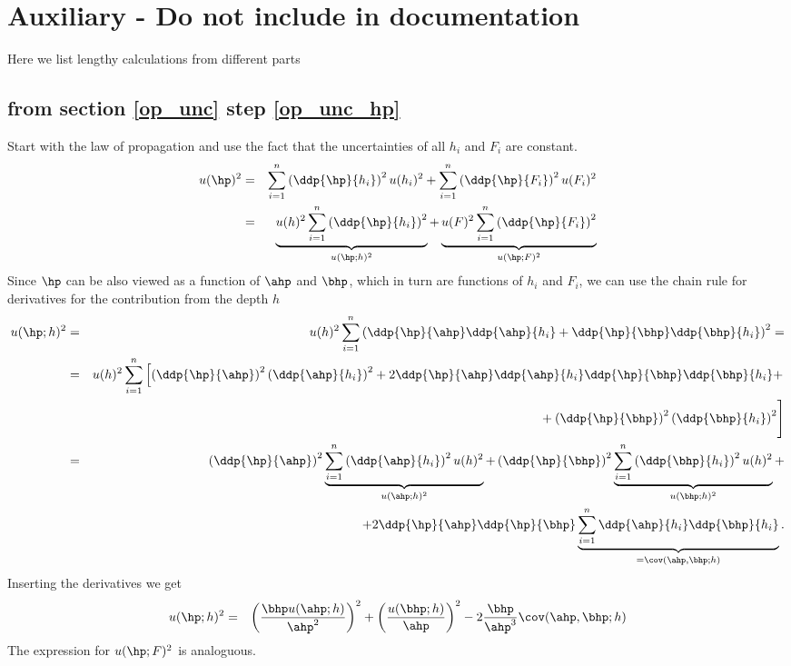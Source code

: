 %
%
\section{Auxiliary - Do not include in documentation}
Here we list lengthy calculations from different parts
\subsection{ from section \ref{op_unc} step \ref{op_unc_hp}}
Start with the law of propagation and use the fact that the uncertainties of all $h_i$ and $F_i$ are constant.
 \begin{eqnarray*}
  u(\hp)^2 &=& \sum_{i=1}^n  \left( \ddp{ \hp}{h_i} \right)^2 u(h_i)^2 + \sum_{i=1}^n   \left( \ddp{ \hp}{F_i} \right)^2 u(F_i)^2 \\
   &=& \underbrace{u(h)^2 \sum_{i=1}^n  \left( \ddp{ \hp}{h_i} \right)^2}_{u(\hp; h)^2} + \underbrace{u(F)^2 \sum_{i=1}^n  \left( \ddp{ \hp}{F_i} \right)^2}_{u(\hp; F)^2} 
 \end{eqnarray*}
 Since $\hp$ can be also viewed as a function of $\ahp$ and  $\bhp$, which in turn are functions of $h_i$ and $F_i$, we can use the chain rule for derivatives for the contribution from the depth $h$
 \begin{eqnarray*}
  u(\hp; h)^2 &= &  
  u(h)^2 \sum_{i=1}^n  \left( 
  \ddp{ \hp}{\ahp} \ddp{ \ahp}{h_i} + 
  \ddp{ \hp}{\bhp} \ddp{\bhp}{h_i}
  \right)^2 = \\
  &= & u(h)^2 \sum_{i=1}^n \left[  
  \left( \ddp{\hp}{\ahp}  \right) ^2 
  \left(\ddp{ \ahp}{h_i} \right)^2 + 
  2 \ddp{ \hp}{ \ahp} \ddp{ \ahp}{ h_i} \ddp{ \hp}{ \bhp}\ddp{ \bhp}{ h_i} + \right.\\
  &&  \left. \phantom{u(h)^2 \sum_{i=1}^n} +
  \left(\ddp{ \hp}{ \bhp}\right)^2
  \left(\ddp{ \bhp}{ h_i}\right)^2  \right] \\
  &=& 
  \left( \ddp{ \hp}{ \ahp}  \right) ^2 
  \underbrace{\sum_{i=1}^n \left(\ddp{ \ahp}{ h_i} \right)^2
  u(h)^2 }_{u(\ahp;h)^2} +
  \left( \ddp{ \hp}{ \bhp}  \right) ^2 
  \underbrace{\sum_{i=1}^n \left(\ddp{ \bhp}{ h_i} \right)^2
   u(h)^2 }_{u(\bhp;h)^2} + \\
   & & + 2 \ddp{ \hp}{ \ahp} \ddp{ \hp}{ \bhp} 
   \underbrace{\sum_{i=1}^n \ddp{ \ahp}{ h_i} \ddp{ \bhp}{ h_i}}_{=\cov(\ahp, \bhp;h)}.
 \end{eqnarray*}
Inserting the derivatives we get
 \begin{eqnarray*}
 u(\hp; h)^2  &=&  \left( \frac{\bhp u(\ahp; h)}{\ahp^2} \right)^2 +\left(\frac{u(\bhp; h)}{\ahp} \right)^2 - 2  \frac{\bhp}{\ahp^3} \cov(\ahp, \bhp; h)
 \end{eqnarray*}
The expression for   $u(\hp; F)^2 $ is analoguous.
 

